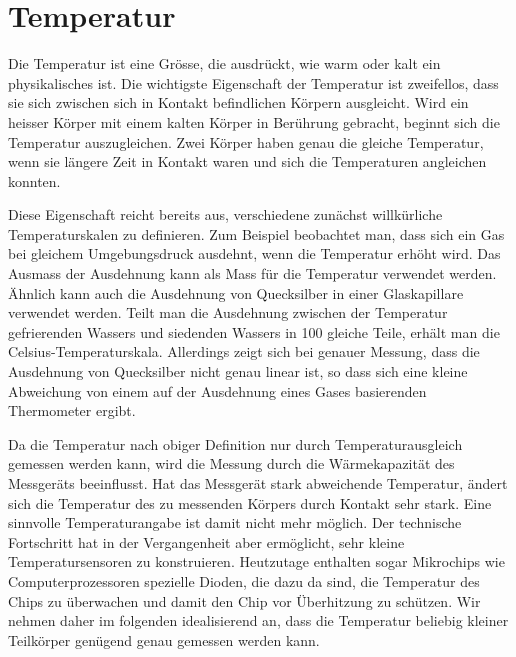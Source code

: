 %
%
%

%
%
\section{Temperatur
\label{buch:fallstudie:temperatur}}
Die Temperatur ist eine Grösse, die ausdrückt, wie warm oder kalt ein
physikalisches ist.
Die wichtigste Eigenschaft der Temperatur ist zweifellos, dass sie
sich zwischen sich in Kontakt befindlichen Körpern ausgleicht.
Wird ein heisser Körper mit einem kalten Körper in Berührung gebracht,
beginnt sich die Temperatur auszugleichen.
Zwei Körper haben genau die gleiche Temperatur, wenn sie längere
Zeit in Kontakt waren und sich die Temperaturen angleichen konnten.

Diese Eigenschaft reicht bereits aus, verschiedene zunächst willkürliche
Temperaturskalen zu definieren.
Zum Beispiel beobachtet man, dass sich ein Gas bei gleichem Umgebungsdruck
ausdehnt, wenn die Temperatur erhöht wird.
Das Ausmass der Ausdehnung kann als Mass für die Temperatur verwendet
werden.
Ähnlich kann auch die Ausdehnung von Quecksilber in einer Glaskapillare
verwendet werden.
Teilt man die Ausdehnung zwischen der Temperatur gefrierenden Wassers und
siedenden Wassers in 100 gleiche Teile, erhält man die Celsius-Temperaturskala.
Allerdings zeigt sich bei genauer Messung, dass die Ausdehnung von
Quecksilber nicht genau linear ist, so dass sich eine kleine Abweichung
von einem auf der Ausdehnung eines Gases basierenden Thermometer
ergibt.

Da die Temperatur nach obiger Definition nur durch Temperaturausgleich
gemessen werden kann, wird die Messung durch die Wärmekapazität des
Messgeräts beeinflusst.
Hat das Messgerät stark abweichende Temperatur, ändert sich die Temperatur
des zu messenden Körpers durch Kontakt sehr stark.
Eine sinnvolle Temperaturangabe ist damit nicht mehr möglich.
Der technische Fortschritt hat in der Vergangenheit aber ermöglicht, sehr
kleine Temperatursensoren zu konstruieren.
Heutzutage enthalten sogar Mikrochips wie Computerprozessoren spezielle
Dioden, die dazu da sind, die Temperatur des Chips zu überwachen und damit
den Chip vor Überhitzung zu schützen.
Wir nehmen daher im folgenden idealisierend an, dass die Temperatur beliebig
kleiner Teilkörper genügend genau gemessen werden kann.

